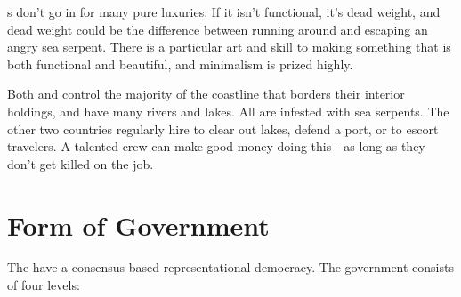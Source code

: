 \documentclass[blue]{GL2020}
\begin{document}
\pShippies{}s don't go in for many pure luxuries. If it isn't functional, it's dead weight, and dead weight could be the difference between running around and escaping an angry sea serpent. There is a particular art and skill to making something that is both functional and beautiful, and minimalism is prized highly.

Both \pFarm{} and \pTech{} control the majority of the coastline that borders their interior holdings, and \pFarm{} have many rivers and lakes. All are infested with sea serpents. The other two countries regularly hire \pShippies{} to clear out lakes, defend a port, or to escort travelers. A talented crew can make good money doing this - as long as they don't get killed on the job.

\section*{Form of Government} The \pShippies{} have a consensus based representational democracy. The government consists of four levels:
\end{document}
